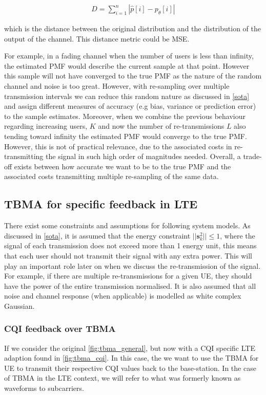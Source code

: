 \documentclass{article}
\begin{document}
\begin{align}
    D = \sum_{i=1}^n |\hat{p}[i] - p_{\theta}[i]|
\end{align}

which is the distance between the original distribution and the distribution of the output of the channel. This distance metric could be \ac{MSE}. 

For example, in a fading channel when the number of users is less than infinity, the estimated \ac{PMF} would describe the current sample at that point. However this sample will not have converged to the true \ac{PMF} as the nature of the random channel and noise is too great. However, with re-sampling over multiple transmission intervals we can reduce this random nature as discussed in \cref{sota} and assign different measures of accuracy (e.g bias, variance or prediction error) to the sample estimates.
Moreover, when we combine the previous behaviour regarding increasing users, $K$ and now the number of re-transmissions $L$ also tending toward infinity the estimated \ac{PMF} would converge to the true \ac{PMF}. However, this is not of practical relevance, due to the associated costs in re-transmitting the signal in such high order of magnitudes needed. Overall, a trade-off exists between how accurate we want to be to the true \ac{PMF} and the associated costs transmitting multiple re-sampling of the same data. 


\subsection{TBMA for specific feedback in LTE}

There exist some constraints and assumptions for following system models. As discussed in \cref{sota}, it is assumed that the energy constraint $||\boldsymbol{s}_{k}^2|| \leq 1$, where the signal of each transmission does not exceed more than 1 energy unit, this means that each user should not transmit their signal with any extra power. This will play an important role later on when we discuss the re-transmission of the signal. For example, if there are multiple re-transmissions for a given \ac{UE}, they should have the power of the entire transmission normalised.  It is also assumed that all noise and channel response (when applicable) is modelled as white complex Gaussian.   

\subsubsection{CQI feedback over TBMA}
If we consider the original \cref{fig:tbma_general}, but now with a \ac{CQI} specific LTE adaption found in \cref{fig:tbma_cqi}. In this case, the we want to use the \ac{TBMA} for \ac{UE} to transmit their respective \ac{CQI} values back to the base-station. In the case of \ac{TBMA} in the LTE context, we will refer to what was formerly known as waveforms to subcarriers.
\end{document}
